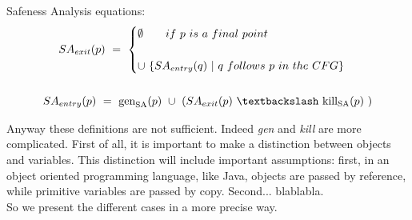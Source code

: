 \documentclass[letterpaper,twocolumn,10pt]{article}
\begin{document}
Safeness Analysis equations:
\begin{gather*}
SA_\textrm{$exit$}(p)\ =\ 
\begin{cases}
\emptyset\qquad if\ p\ is\ a\ final\ point\ \\ \\
\cup\ \lbrace SA_\textrm{$entry$}(q)\ |\ q\ follows\ p\ in\ the\ CFG \rbrace 
\end{cases} \\ \\
SA_\textrm{$entry$}(p)\ =\ \text{gen}_\textrm{SA}(p)\ \cup\ (SA_\textrm{$exit$}(p)\ \textbackslash\ \text{kill}_\textrm{SA}(p)\ )
\end{gather*}

Anyway these definitions are not sufficient. Indeed \emph{gen} and \emph{kill} are more complicated. First of all, it is important to make a distinction between objects and variables. This distinction will include important assumptions: first, in an object oriented programming language, like Java, objects are passed by reference, while primitive variables are passed by copy. Second... blablabla. \\
So we present the different cases in a more precise way.\\
\end{document}
